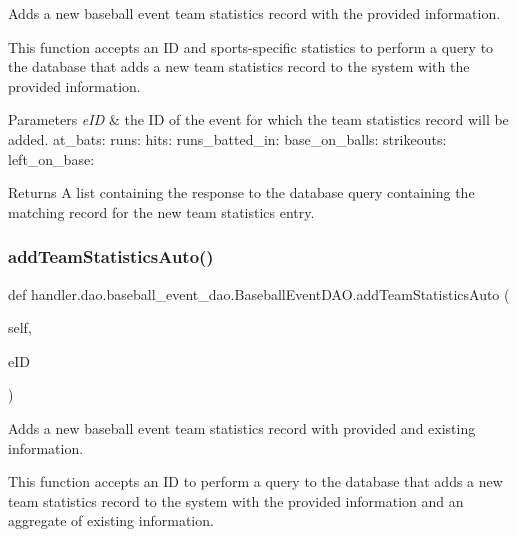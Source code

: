 Adds a new baseball event team statistics record with the provided information. 

This function accepts an ID and sports-\/specific statistics to perform a query to the database that adds a new team statistics record to the system with the provided information.


\begin{DoxyParams}{Parameters}
{\em e\+ID} & the ID of the event for which the team statistics record will be added. at\+\_\+bats\+: runs\+: hits\+: runs\+\_\+batted\+\_\+in\+: base\+\_\+on\+\_\+balls\+: strikeouts\+: left\+\_\+on\+\_\+base\+:\\
\hline
\end{DoxyParams}
\begin{DoxyReturn}{Returns}
A list containing the response to the database query containing the matching record for the new team statistics entry. 
\end{DoxyReturn}
\mbox{\label{classhandler_1_1dao_1_1baseball__event__dao_1_1_baseball_event_d_a_o_a31bb64535cabe71a0a9f7b8223e8d95a}} 
\subsubsection{\texorpdfstring{add\+Team\+Statistics\+Auto()}{addTeamStatisticsAuto()}}
{\footnotesize\ttfamily def handler.\+dao.\+baseball\+\_\+event\+\_\+dao.\+Baseball\+Event\+D\+A\+O.\+add\+Team\+Statistics\+Auto (\begin{DoxyParamCaption}\item[{}]{self,  }\item[{}]{e\+ID }\end{DoxyParamCaption})}



Adds a new baseball event team statistics record with provided and existing information. 

This function accepts an ID to perform a query to the database that adds a new team statistics record to the system with the provided information and an aggregate of existing information.



